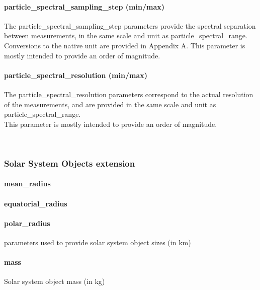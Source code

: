 \documentclass[11pt,a4paper]{ivoa}
\begin{document}
\paragraph{particle\_spectral\_sampling\_step (min/max)}

The particle\_spectral\_sampling\_step parameters provide the spectral separation between measurements, in the same scale and unit as particle\_spectral\_range.\\Conversions to the native unit are provided in Appendix A. This parameter is mostly intended to provide an order of magnitude.

\paragraph{particle\_spectral\_resolution (min/max)}

The particle\_spectral\_resolution parameters correspond to the actual resolution of the measurements, and are provided in the same scale and unit as particle\_spectral\_range. \\This parameter is mostly intended to provide an order of magnitude.

\\

\subsubsection{Solar System Objects extension\\}

\paragraph{mean\_radius}

\paragraph{equatorial\_radius}

\paragraph{polar\_radius}

parameters used to provide solar system object sizes (in km)

\paragraph{mass}

Solar system object mass (in kg)
\end{document}
